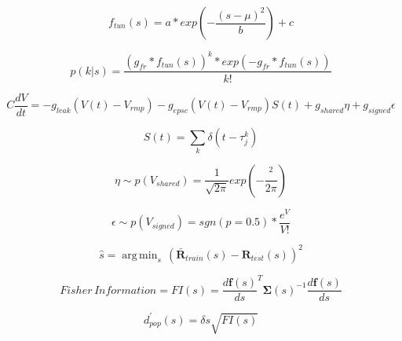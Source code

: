 \documentclass{article}
\DeclareMathOperator*{\argmin}{arg\,min}
\begin{document}
\begin{equation}
f_{tun}(s) = a * exp{\left( -\frac{(s-\mu)^{2}}{b} \right)} + c
\end{equation}

\begin{equation}
p(k | s) = \frac{(g_{fr}*f_{tun}(s))^{k} * exp{\left(-g_{fr}*f_{tun}(s)\right)}}{k!}
\end{equation}

\begin{equation}
C\frac{dV}{dt} = - g_{leak}(V(t) - V_{rmp}) - g_{epsc}(V(t) - V_{rmp})S(t) + g_{shared}\eta + g_{signed}\epsilon
\end{equation}

\begin{equation}
S(t) = \sum_{k} \delta(t-\tau_{j}^{k})
\end{equation}

\begin{equation}
\eta \sim p(V_{shared}) = \frac{1}{\sqrt{2\pi}} exp{\left(-\frac{^{2}}{2\pi} \right)}
\end{equation}

\begin{equation}
\epsilon \sim p(V_{signed}) = sgn(p=0.5) * \frac{e^{V}}{V!}
\end{equation}

\begin{equation}
\hat{s} = \argmin_{s} \, (\mathbf{\bar{R}}_{train}(s) - \mathbf{R}_{test}(s))^{2}
\end{equation}

\begin{equation}
Fisher \, Information = FI(s) = \frac{d\mathbf{f}(s)}{ds}^{T} \mathbf{\Sigma}(s)^{-1} \frac{d\mathbf{f}(s)}{ds}
\end{equation}

\begin{equation}
d^{'}_{pop}(s) = \delta s \sqrt{FI(s)}
\end{equation}

	
\end{document}
